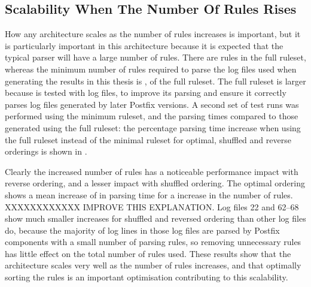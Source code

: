 \subsection{Scalability When The Number Of Rules Rises}

\label{scalability as the number of rules rises}

How any architecture scales as the number of rules increases is important,
but it is particularly important in this architecture because it is
expected that the typical parser will have a large number of rules.  There
are \numberOFrules{} rules in the full \parsername{} ruleset, whereas the
minimum number of rules required to parse the \numberOFlogFILES{} log files
used when generating the results in this thesis is \numberOFrulesMINIMUM{},
\numberOFrulesMINIMUMpercentage{} of the full ruleset.  The full ruleset is
larger because \parsername{} is tested with \numberOFlogFILESall{} log
files, to improve its parsing and ensure it correctly parses log files
generated by later Postfix versions.  A second set of test runs was
performed using the minimum ruleset, and the parsing times compared to
those generated using the full ruleset: the percentage parsing time
increase when using the full ruleset instead of the minimal ruleset for
optimal, shuffled and reverse orderings is shown in .


Clearly the increased number of rules has a noticeable performance impact
with reverse ordering, and a lesser impact with shuffled ordering.  The
optimal ordering shows a mean increase of
 in parsing time for a
\numberOFrulesMAXIMUMpercentage{} increase in the number of rules.
XXXXXXXXXXXX IMPROVE THIS EXPLANATION\@.  Log files 22 and 62--68 show much
smaller increases for shuffled and reversed ordering than other log files
do, because the majority of log lines in those log files are parsed by
Postfix components with a small number of parsing rules, so removing
unnecessary rules has little effect on the total number of rules used.
These results show that the architecture scales very well as the number of
rules increases, and that optimally sorting the rules is an important
optimisation contributing to this scalability.

